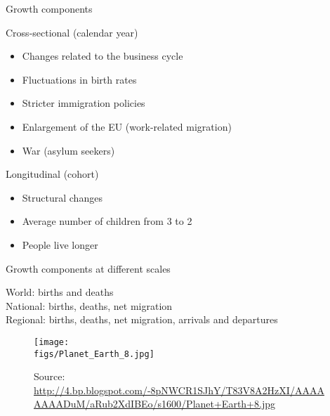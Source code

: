 \documentclass[final, 12pt, aspectratio=169, xcolor={dvipsnames}]{beamer}
\newcommand*{\figs}{../figs}%
\newcommand{\semitransp}[2][35]{\color{fg!#1}#2}
\newcommand{\source}[1]{\caption*{\tiny Source: {#1}} }
\begin{document}
\begin{frame}{Growth components}
  \begin{minipage}[t]{0.48\linewidth}%
    Cross-sectional (calendar year)
    \begin{itemize}
    \item Changes related to the business cycle
    \item Fluctuations in birth rates
      \item Stricter immigration policies
    \item Enlargement of the EU (work-related migration)
      \item War (asylum seekers)
      \end{itemize}
 
\end{minipage}%
\hfill%
\begin{minipage}[t]{0.48\linewidth}
  Longitudinal (cohort)
  \begin{itemize}
  \item Structural changes
  \item Average number of children from 3 to 2
  \item People live longer
      \end{itemize}
\end{minipage}    
\end{frame}

\begin{frame}{Growth components at different scales}
  \noindent
\begin{minipage}[t]{0.48\linewidth}%

  World: births and deaths \\
  \semitransp{National: births, deaths, net migration} \\
  \semitransp{Regional: births, deaths, net migration, arrivals and departures} \\
  
\end{minipage}%
\hfill%
\begin{minipage}[t]{0.48\linewidth}
  \vspace{-1cm}
  \begin{figure}
    \texttt{[image: \\figs/Planet\_Earth\_8.jpg]}
    \source{\url{http://4.bp.blogspot.com/-8pNWCR1SJhY/T83V8A2HzXI/AAAAAAAADuM/aRub2XdIBEo/s1600/Planet+Earth+8.jpg}}
  \end{figure}
\end{minipage}    

\end{frame}
\end{document}
